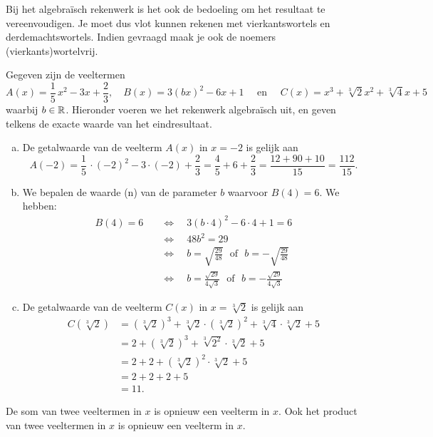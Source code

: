 \documentclass{ximera}
\begin{document}
Bij het algebra\"isch rekenwerk is het ook de bedoeling om het resultaat te vereenvoudigen. Je moet dus vlot kunnen rekenen met vierkantswortels en derdemachtswortels. 
Indien gevraagd maak je ook de noemers (vierkants)wortelvrij. 

\begin{example} 
Gegeven zijn de veeltermen
\[
A(x) = \frac{1}{5}\,x^2-3x+\frac{2}{3}, \quad B(x) = 3(bx)^2-6x+1 \quad \text{ en } \quad C(x) = x^3 + \sqrt[3]{2} x^2 + \sqrt[3]{4}x+5
\]
waarbij $b \in \mathbb{R}$. Hieronder voeren we het rekenwerk algebra\"isch uit, en geven telkens de exacte waarde van het eindresultaat. 
\begin{enumerate}[(a)]
\item
De getalwaarde van de veelterm $A(x)$ in $x = -2$ is gelijk aan
\[
A(-2) = \frac{1}{5}\,\cdot (-2)^2-3\cdot(-2)+\frac{2}{3} = \frac{4}{5} +6+ \frac{2}{3} = \frac{12 + 90 + 10}{15} = \frac{112}{15}.
\]
\item
We bepalen de waarde (n) van de parameter $b$ waarvoor $B(4) = 6$. We hebben:
\begin{align*}
B(4) = 6 \quad 
& \Leftrightarrow \quad 3(b\cdot 4)^2-6\cdot 4+1 = 6 \\ 
& \Leftrightarrow \quad 48b^2 = 29 \\
& \Leftrightarrow \quad b = \sqrt{\frac{29}{48}} \,\,\text{ of }\,\, b = - \sqrt{\frac{29}{48}} \\
& \Leftrightarrow \quad b = \frac{\sqrt{29}}{4\sqrt{3}} \,\,\text{ of }\,\, b = - \frac{\sqrt{29}}{4\sqrt{3}}
\end{align*}
\item
De getalwaarde van de veelterm $C(x)$ in $x = \sqrt[3]{2}$ is gelijk aan
\begin{align*}
C(\sqrt[3]{2}) & = (\sqrt[3]{2})^3 + \sqrt[3]{2}\cdot(\sqrt[3]{2})^2 + \sqrt[3]{4}\cdot \sqrt[3]{2}+5 \\
& = 2 + (\sqrt[3]{2})^3 + \sqrt[3]{2^2}\cdot \sqrt[3]{2} + 5 \\
& = 2 + 2 + (\sqrt[3]{2})^2 \cdot \sqrt[3]{2} + 5 \\
& = 2 + 2 + 2 + 5 \\
& = 11.
\end{align*}
\end{enumerate}
\end{example} 

De som van twee veeltermen in $x$ is opnieuw een veelterm in $x$. Ook het product van twee veeltermen in $x$ is opnieuw een veelterm in $x$. 
\end{document}
